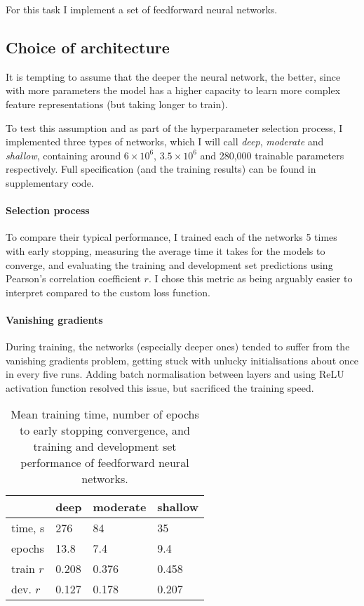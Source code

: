 \documentclass[10pt, twocolumn]{article}
\begin{document}
For this task I implement a set of feedforward neural networks.

\subsection{Choice of architecture}
It is tempting to assume that the deeper the neural network, the better, since with more parameters the model has a higher capacity to learn more complex feature representations (but taking longer to train). 

To test this assumption and as part of the hyperparameter selection process, I implemented three types of networks, which I will call \textit{deep}, \textit{moderate} and \textit{shallow}, containing around $6\times 10^6$, $3.5\times 10^6$ and 280,000 trainable parameters respectively. Full specification (and the training results) can be found in supplementary code. 

\paragraph{Selection process} To compare their typical performance, I trained each of the networks 5 times with early stopping, measuring the average time it takes for the models to converge, and evaluating the training and development set predictions using Pearson's correlation coefficient $r$. I chose this metric as being arguably easier to interpret compared to the custom loss function.

\paragraph{Vanishing gradients} During training, the networks (especially deeper ones) tended to suffer from the vanishing gradients problem, getting stuck with unlucky initialisations about once in every five runs. Adding batch normalisation between layers and using ReLU activation function resolved this issue, but sacrificed the training speed. 

\begin{table}[]
	\begin{tabularx}{\linewidth}{XXXX}
		\hline
				& \textbf{deep} & \textbf{moderate} & \textbf{shallow}\\ \hline
		time, s     & 276   & 84  & 35 \\
		epochs & 13.8 & 7.4 & 9.4 \\
		train $r$ & 0.208 & 0.376 & 0.458 \\
		dev. $r$ & 0.127 & 0.178 & 0.207
		\end{tabularx}
\caption{Mean training time, number of epochs to early stopping convergence, and training and development set performance of feedforward neural networks.}\label{g1}
\end{table}
\end{document}
